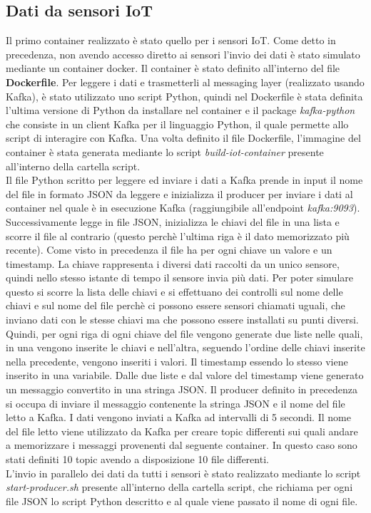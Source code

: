 \documentclass{article}
\begin{document}
\subsection{Dati da sensori IoT}
Il primo container realizzato è stato quello per i sensori IoT. Come detto in precedenza, non avendo accesso diretto ai sensori l'invio dei dati è stato simulato mediante un container docker.
Il container è stato definito all'interno del file \textbf{Dockerfile}. Per leggere i dati e trasmetterli al messaging layer (realizzato usando Kafka), è stato utilizzato uno script Python, quindi nel Dockerfile è stata definita l'ultima versione di Python da installare nel container e il package \textit{kafka-python} che consiste in un client Kafka per il linguaggio Python, il quale permette allo script di interagire con Kafka.
Una volta definito il file Dockerfile, l'immagine del container è stata generata mediante lo script \textit{build-iot-container} presente all'interno della cartella script.\\
Il file Python scritto per leggere ed inviare i dati a Kafka prende in input il nome del file in formato JSON da leggere e inizializza il producer per inviare i dati al container nel quale è in esecuzione Kafka (raggiungibile all'endpoint \textit{kafka:9093}). Successivamente legge in file JSON, inizializza le chiavi del file in una lista e scorre il file al contrario (questo perchè l'ultima riga è il dato memorizzato più recente). Come visto in precedenza il file ha per ogni chiave un valore e un timestamp. La chiave rappresenta i diversi dati raccolti da un unico sensore, quindi nello stesso istante di tempo il sensore invia più dati. Per poter simulare questo si scorre la lista delle chiavi e si effettuano dei controlli sul nome delle chiavi e sul nome del file perchè ci possono essere sensori chiamati uguali, che inviano dati con le stesse chiavi ma che possono essere installati su punti diversi. Quindi, per ogni riga di ogni chiave del file vengono generate due liste nelle quali, in una vengono inserite le chiavi e nell'altra, seguendo l'ordine delle chiavi inserite nella precedente, vengono inseriti i valori. Il timestamp essendo lo stesso viene inserito in una variabile. Dalle due liste e dal valore del timestamp viene generato un messaggio convertito in una stringa JSON. Il producer definito in precedenza si occupa di inviare il messaggio contenente la stringa JSON e il nome del file letto a Kafka. I dati vengono inviati a Kafka ad intervalli di 5 secondi. Il nome del file letto viene utilizzato da Kafka per creare topic differenti sui quali andare a memorizzare i messaggi provenenti dal seguente container. In questo caso sono stati definiti 10 topic avendo a disposizione 10 file differenti.\\
L'invio in parallelo dei dati da tutti i sensori è stato realizzato mediante lo script \textit{start-producer.sh} presente all'interno della cartella script, che richiama per ogni file JSON lo script Python descritto e al quale viene passato il nome di ogni file. 
\end{document}
